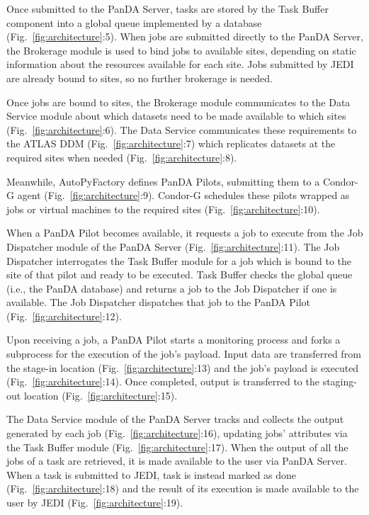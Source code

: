 Once submitted to the PanDA Server, tasks are stored by the Task Buffer
component into a global queue implemented by a database
(Fig.~\ref{fig:architecture}:5). When jobs are submitted directly to the
PanDA Server, the Brokerage module is used to bind jobs to available sites,
depending on static information about the resources available for each site.
Jobs submitted by JEDI are already bound to sites, so no further brokerage is
needed.

Once jobs are bound to sites, the Brokerage module communicates to the Data
Service module about which datasets need to be made available to which sites
(Fig.~\ref{fig:architecture}:6). The Data Service communicates these
requirements to the ATLAS DDM (Fig.~\ref{fig:architecture}:7) which
replicates datasets at the required sites when needed
(Fig.~\ref{fig:architecture}:8).

Meanwhile, AutoPyFactory defines PanDA Pilots, submitting them to a Condor-G
agent (Fig.~\ref{fig:architecture}:9). Condor-G schedules these pilots
wrapped as jobs or virtual machines to the required sites
(Fig.~\ref{fig:architecture}:10).

When a PanDA Pilot becomes available, it requests a job to execute from the
Job Dispatcher module of the PanDA Server (Fig.~\ref{fig:architecture}:11).
The Job Dispatcher interrogates the Task Buffer module for a job which is
bound to the site of that pilot and ready to be executed. Task Buffer checks
the global queue (i.e., the PanDA database) and returns a job to the Job
Dispatcher if one is available. The Job Dispatcher dispatches that job to the
PanDA Pilot (Fig.~\ref{fig:architecture}:12).

Upon receiving a job, a PanDA Pilot starts a monitoring process and forks a
subprocess for the execution of the job's payload. Input data are transferred
from the stage-in location (Fig.~\ref{fig:architecture}:13) and the job's
payload is executed (Fig.~\ref{fig:architecture}:14). Once completed, output
is transferred to the staging-out location (Fig.~\ref{fig:architecture}:15).

The Data Service module of the PanDA Server tracks and collects the output
generated by each job (Fig.~\ref{fig:architecture}:16), updating jobs'
attributes via the Task Buffer module (Fig.~\ref{fig:architecture}:17). When
the output of all the jobs of a task are retrieved, it is made available to
the user via PanDA Server. When a task is submitted to JEDI, task is instead
marked as done (Fig.~\ref{fig:architecture}:18) and the result of its
execution is made available to the user by JEDI
(Fig.~\ref{fig:architecture}:19).

